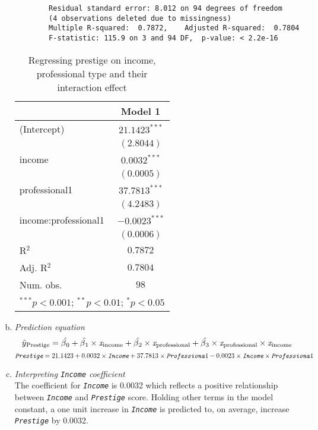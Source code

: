 \documentclass[12pt,letterpaper]{article}
\begin{document}
\begin{enumerate}[(a)]
\begin{verbatim}
		Residual standard error: 8.012 on 94 degrees of freedom
		(4 observations deleted due to missingness)
		Multiple R-squared:  0.7872,	Adjusted R-squared:  0.7804 
		F-statistic: 115.9 on 3 and 94 DF,  p-value: < 2.2e-16
		\end{verbatim}
		\begin{table}[H]
			\begin{center}
				\begin{tabular}{l c}
					\hline
					& Model 1 \\
					\hline
					(Intercept)          & $21.1423^{***}$ \\
					& $(2.8044)$      \\
					income               & $0.0032^{***}$  \\
					& $(0.0005)$      \\
					professional1        & $37.7813^{***}$ \\
					& $(4.2483)$      \\
					income:professional1 & $-0.0023^{***}$ \\
					& $(0.0006)$      \\
					\hline
					R$^2$                & $0.7872$        \\
					Adj. R$^2$           & $0.7804$        \\
					Num. obs.            & $98$            \\
					\hline
					\multicolumn{2}{l}{\scriptsize{$^{***}p<0.001$; $^{**}p<0.01$; $^{*}p<0.05$}}
				\end{tabular}
				\caption{Regressing prestige on income, professional type and their interaction effect}
				\label{table:coefficients}
			\end{center}
		\end{table}
	
		\item \textit{Prediction equation}
		$$\hat{y}\textsubscript{Prestige} = \hat{\beta\textsubscript{0}} + \hat{\beta\textsubscript{1}} \times \textit{x}\textsubscript{income} + \hat{\beta\textsubscript{2}} \times \textit{x}\textsubscript{professional} + \hat{\beta\textsubscript{3}} \times \textit{x}\textsubscript{professional} \times \textit{x}\textsubscript{income} $$
		$$ \textit{\texttt{Prestige}} = 21.1423 + 0.0032 \times \textit{\texttt{Income}} + 37.7813 \times \textit{\texttt{Professional}} - 0.0023 \times \textit{\texttt{Income}} \times \textit{\texttt{Professional}} $$
		
		\item \textit{Interpreting \textit{\texttt{Income}} coefficient}\\
		The coefficient for \textit{\texttt{Income}} is 0.0032 which reflects a positive relationship between \textit{\texttt{Income}} and \textit{\texttt{Prestige}} score. Holding other terms in the model constant, a one unit increase in \textit{\texttt{Income}} is predicted to, on average, increase \textit{\texttt{Prestige}} by 0.0032.
		

\end{enumerate}
\end{document}
